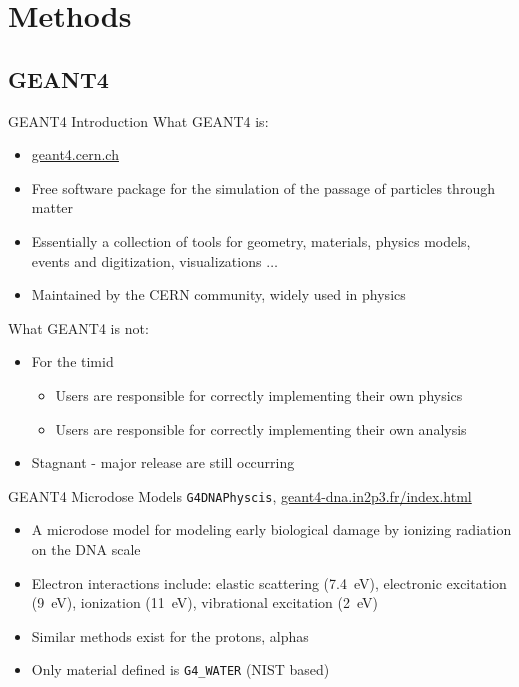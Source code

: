\documentclass[compress]{beamer}
\begin{document}
\section{Methods}
\subsection{GEANT4}
\begin{frame}[fragile]{GEANT4 Introduction}
What GEANT4 is:
\begin{itemize}
  \small
  \item \href{geant4.cern.ch}{geant4.cern.ch}
  \item Free software package for the simulation of the passage of particles through matter
  \item Essentially a collection of tools for geometry, materials, physics models, events and digitization, visualizations $\dots$
  \item Maintained by the CERN community, widely used in physics
\end{itemize}
What GEANT4 is not:
\begin{itemize}
  \small
  \item For the timid
  \begin{itemize}
    \item Users are responsible for correctly implementing their own physics
    \item Users are responsible for correctly implementing their own analysis
  \end{itemize}
  \item Stagnant - major release are still occurring
\end{itemize}
\end{frame}
\begin{frame}[fragile]{GEANT4 Microdose Models}
\verb+G4DNAPhyscis+, \href{geant4-dna.in2p3.fr}{geant4-dna.in2p3.fr/index.html}
  \begin{itemize}
    \item A microdose model for modeling early biological damage by ionizing radiation on the DNA scale
    \item Electron interactions include: elastic scattering (\SI{7.4}{\eV}), electronic excitation (\SI{9}{\eV}), ionization (\SI{11}{\eV}), vibrational excitation (\SI{2}{\eV})
    \item Similar methods exist for the protons, alphas
    \item Only material defined is \verb+G4_WATER+ (NIST based)
  \end{itemize}
\end{frame}
\end{document}
